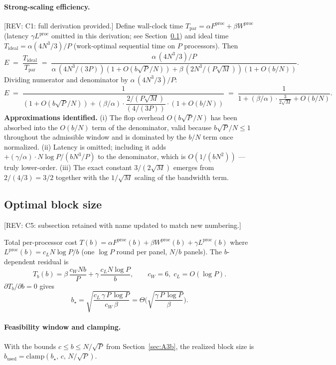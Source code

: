 \documentclass[11pt]{article}
\newcommand{\REV}[1]{\textcolor{blue!60!black}{\small\textsf{[REV: #1]}}}
\begin{document}
\paragraph{Strong-scaling efficiency.}
\REV{C1: full derivation provided.} Define wall-clock time
$T_{\mathrm{par}} = \alpha F^{\mathrm{proc}} + \beta W^{\mathrm{proc}}$
(latency $\gamma L^{\mathrm{proc}}$ omitted in this derivation; see
Section~\ref{sec:A3eprimeprime}) and ideal time
$T_{\mathrm{ideal}} = \alpha (4 N^3/3) / P$ (work-optimal sequential
time on $P$ processors). Then
\[
  E
  \;=\; \frac{T_{\mathrm{ideal}}}{T_{\mathrm{par}}}
  \;=\; \frac{\alpha\,(4 N^3/3)/P}
              {\alpha\,(4 N^3/(3P))(1 + O(b\sqrt{P}/N))
               + \beta\,(2 N^3/(P\sqrt{M}))(1 + O(b/N))}.
\]
Dividing numerator and denominator by $\alpha\,(4 N^3/3)/P$:
\[
  E
  \;=\; \frac{1}
              {(1 + O(b\sqrt{P}/N))
               + (\beta/\alpha)\cdot\dfrac{2/(P\sqrt{M})}{(4/(3P))}\cdot
                 (1 + O(b/N))}
  \;=\; \frac{1}
              {1 + (\beta/\alpha)\cdot\frac{3}{2\sqrt{M}}
                 + O(b/N)}.
\]
\textbf{Approximations identified.} (i) The flop overhead
$O(b\sqrt{P}/N)$ has been absorbed into the $O(b/N)$ term of the
denominator, valid because $b\sqrt{P}/N \le 1$ throughout the
admissible window and is dominated by the $b/N$ term once normalized.
(ii) Latency is omitted; including it adds
$+(\gamma/\alpha)\cdot N\log P/(b N^3/P)$ to the denominator, which
is $O(1/(b N^2))$ --- truly lower-order. (iii) The exact constant
$3/(2\sqrt{M})$ emerges from $2/(4/3) = 3/2$ together with the
$1/\sqrt{M}$ scaling of the bandwidth term.

\subsection{Optimal block size}
\label{sec:A3eprimeprime}
\REV{C5: subsection retained with name updated to match new numbering.}

Total per-processor cost
$T(b) = \alpha F^{\mathrm{proc}}(b) + \beta W^{\mathrm{proc}}(b)
+ \gamma L^{\mathrm{proc}}(b)$
where $L^{\mathrm{proc}}(b) = c_L N\log P/b$ (one $\log P$ round per
panel, $N/b$ panels). The $b$-dependent residual is
\[
  T_b(b) = \beta\,\frac{c_W N b}{P}
         + \gamma\,\frac{c_L N \log P}{b},
  \qquad c_W = 6,\; c_L = O(\log P).
\]
$\partial T_b/\partial b = 0$ gives
\[
  \boxed{\; b_\star = \sqrt{\frac{c_L\,\gamma\,P\,\log P}{c_W\,\beta}}
                    = \Theta\!\Big(\sqrt{\frac{\gamma\,P\,\log P}{\beta}}\Big).\;}
\]

\paragraph{Feasibility window and clamping.}
With the bounds $c \le b \le N/\sqrt{P}$ from
Section~\ref{sec:A3b}, the realized block size is
$b_{\mathrm{used}} = \mathrm{clamp}(b_\star,\, c,\, N/\sqrt{P})$.
\end{document}
